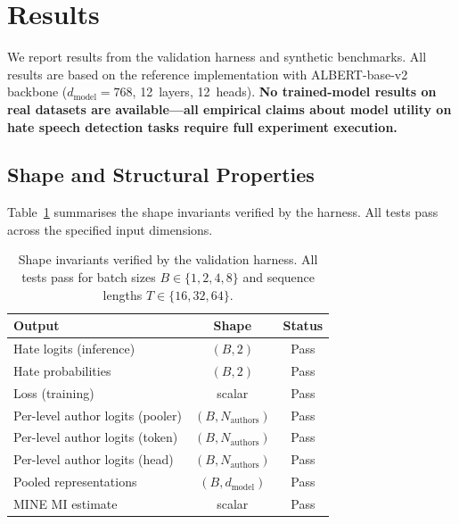 \documentclass{article}
\begin{document}

\section{Results}
\label{sec:results}

We report results from the validation harness and synthetic benchmarks.
All results are based on the reference implementation with
ALBERT-base-v2 backbone ($d_{\text{model}}=768$, 12~layers, 12~heads).
\textbf{No trained-model results on real datasets are available---all
empirical claims about model utility on hate speech detection tasks
require full experiment execution.}

\subsection{Shape and Structural Properties}

Table~\ref{tab:shapes} summarises the shape invariants verified by the
harness. All tests pass across the specified input dimensions.

\begin{table}[h]
  \centering
  \caption{Shape invariants verified by the validation harness.
           All tests pass for batch sizes $B\in\{1,2,4,8\}$ and
           sequence lengths $T\in\{16,32,64\}$.}
  \label{tab:shapes}
  \begin{tabular}{lcc}
    \toprule
    \textbf{Output} & \textbf{Shape} & \textbf{Status} \\
    \midrule
    Hate logits (inference) & $(B, 2)$ & Pass \\
    Hate probabilities & $(B, 2)$ & Pass \\
    Loss (training) & scalar & Pass \\
    Per-level author logits (pooler) & $(B, N_{\text{authors}})$ & Pass \\
    Per-level author logits (token) & $(B, N_{\text{authors}})$ & Pass \\
    Per-level author logits (head) & $(B, N_{\text{authors}})$ & Pass \\
    Pooled representations & $(B, d_{\text{model}})$ & Pass \\
    MINE MI estimate & scalar & Pass \\
    \bottomrule
  \end{tabular}
\end{table}
\end{document}
